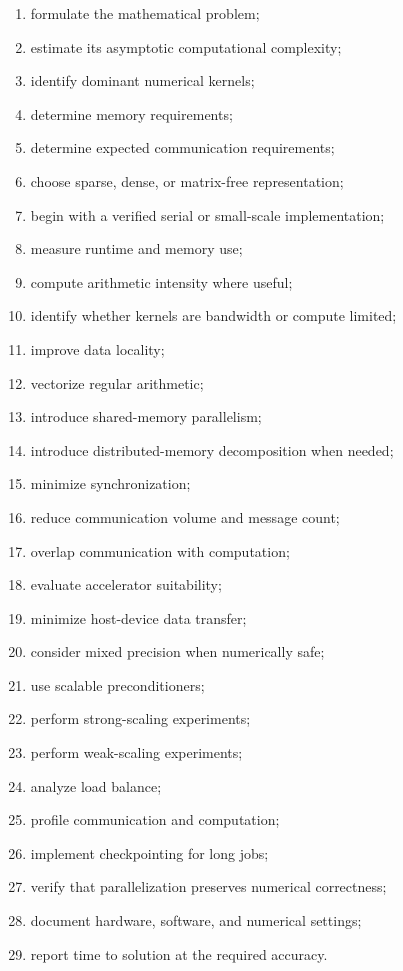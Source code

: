 \begin{enumerate}
    \item formulate the mathematical problem;
    \item estimate its asymptotic computational complexity;
    \item identify dominant numerical kernels;
    \item determine memory requirements;
    \item determine expected communication requirements;
    \item choose sparse, dense, or matrix-free representation;
    \item begin with a verified serial or small-scale implementation;
    \item measure runtime and memory use;
    \item compute arithmetic intensity where useful;
    \item identify whether kernels are bandwidth or compute limited;
    \item improve data locality;
    \item vectorize regular arithmetic;
    \item introduce shared-memory parallelism;
    \item introduce distributed-memory decomposition when needed;
    \item minimize synchronization;
    \item reduce communication volume and message count;
    \item overlap communication with computation;
    \item evaluate accelerator suitability;
    \item minimize host-device data transfer;
    \item consider mixed precision when numerically safe;
    \item use scalable preconditioners;
    \item perform strong-scaling experiments;
    \item perform weak-scaling experiments;
    \item analyze load balance;
    \item profile communication and computation;
    \item implement checkpointing for long jobs;
    \item verify that parallelization preserves numerical correctness;
    \item document hardware, software, and numerical settings;
    \item report time to solution at the required accuracy.
\end{enumerate}

